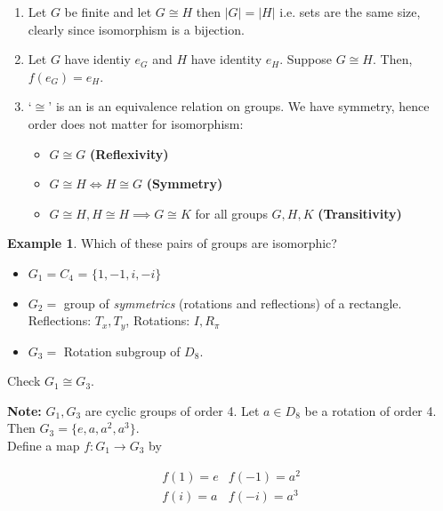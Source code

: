 \documentclass{article}
\theoremstyle{definition} \newtheorem*{definition}{Definition}
\newtheorem*{exmp}{Example} \newtheorem*{exmps}{Examples}
\newcommand{\ism}{\cong} \newcommand{\elemt}[2]{#1_{{#2}\sigma(#2)}}
\begin{document}
\begin{remark}\hfill \begin{enumerate} \item Let $G$ be finite and let $G \ism
        H$ then $|G|=|H|$ i.e. sets are the same size, clearly since
      isomorphism is a bijection.  \item Let $G$ have identiy $e_G$ and $H$
        have identity $e_H$. Suppose $G \ism H$. Then, $f(e_G)=e_H$.  \item
        `$\ism$' is an is an equivalence relation on groups.  We have symmetry,
      hence order does not matter for isomorphism: \begin{itemize} \item$G \ism
            G $ \textbf{(Reflexivity)} \item$G \ism H \iff H \ism G$
            \textbf{(Symmetry)} \item $G \ism H, H \ism H \implies G \ism K $
              for all groups $G,H,K$\textbf{ (Transitivity)}\\ \end{itemize}
      \end{enumerate} \end{remark}

\begin{exmp} Which of these pairs of groups are isomorphic?  \begin{itemize}
      \item $G_1 = C_4$ = $\{1,-1,i,-i\}$ \item $G_2 = $ group of
        \emph{symmetrics} (rotations and reflections) of a rectangle.\\
        Reflections: $T_x, T_y$, Rotations: $I, R_\pi$ \item $G_3 = $ Rotation
          subgroup of $D_8$.  \end{itemize}
  
Check $G_1 \ism G_3$.  \end{exmp}

\textbf{Note:} $G_1, G_3$ are cyclic groups of order 4. Let $a \in D_8$ be a
rotation of order 4.  Then $G_3 = \{e,a,a^2, a^3\}$.\hfill\\

Define a map $f:G_1 \rightarrow G_3$ by 

\begin{equation*} \begin{matrix} f(1)=e & f(-1) = a^2 \\ f(i)=a & f(-i) = a^3
  \end{matrix} \label{} \end{equation*}
\end{document}
